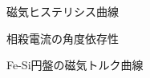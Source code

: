 \documentclass[uplatex,a4j,11pt,dvipdfmx]{jsarticle}
\begin{document}
%
%
%
%
%
%

\begin{figure}
  \begin{center}
    
    \caption{磁気ヒステリシス曲線}
  \end{center}
\end{figure}

\begin{figure}
  \begin{center}
    
    \caption{相殺電流の角度依存性}
  \end{center}
\end{figure}

\begin{figure}
  \begin{center}
    
    \caption{Fe-Si円盤の磁気トルク曲線}
  \end{center}
\end{figure}

\begin{figure}
  \begin{center}
    
  \end{center}
\end{figure}


\end{document}
